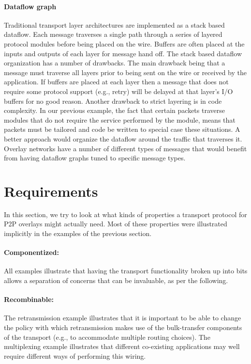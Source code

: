 \paragraph{Dataflow graph}
Traditional transport layer architectures are implemented as a stack
based dataflow.  
Each message traverses a single path through a series of layered protocol 
modules before being placed on the wire. Buffers are often placed at the inputs
and outputs of each layer for message hand off. The stack based dataflow 
organization has a number of drawbacks. The main drawback being that a
message must traverse all layers prior to being sent on the wire or received
by the application. If buffers are placed at each layer then a message
that does  
not require some protocol support (e.g., retry) will be delayed at
that layer's I/O  
buffers for no good reason. Another drawback to strict layering is in
code complexity.  
In our previous example, the 
fact that certain packets traverse modules that do not require the
service performed 
by the module, means that packets must be tailored and code be written
to special case  
these situations. A better approach would organize the dataflow around
the  traffic that traverses it. Overlay networks have a number of
different types of 
messages that would benefit from having dataflow graphs tuned to
specific message 
types.

\section{Requirements}
\label{sec:requirements}

In this section, we try to look at what kinds of properties a
transport protocol for P2P overlays might actually need.  Most of these
properties were illustrated implicitly in the examples of the previous
section.

\paragraph{Componentized:} All examples illustrate that having the
transport functionality broken up into bits allows a separation of
concerns that can be invaluable, as per the following. 


\paragraph{Recombinable:} The retransmission example
illustrates that it is important to be able to change the policy with
which retransmission makes use of the bulk-transfer components of the
transport (e.g., to accommodate multiple routing choices).  The
multiplexing example illustrates that different co-existing applications
may well require different ways of performing this wiring.

